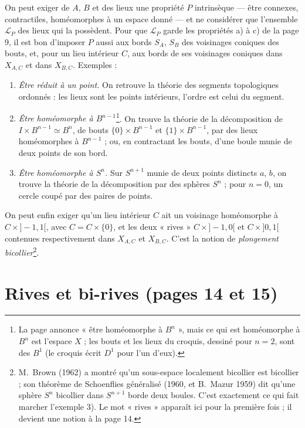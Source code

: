 \documentclass[11pt,a4paper]{article}
\begin{document}
On peut exiger de $A$, $B$ et des lieux une propriété $P$ intrinsèque --- être
connexes, contractiles, homéomorphes à un espace donné --- et ne considérer que
l'ensemble $\mathcal{L}_{P}$ des lieux qui la possèdent. Pour que $\mathcal{L}_{P}$
garde les propriétés a) à c) de la page 9, il est bon d'imposer $P$ aussi aux bords
$S_{A}$, $S_{B}$ des voisinages coniques des bouts, et, pour un lieu intérieur $C$,
aux bords de ses voisinages coniques dans $X_{A,C}$ et dans $X_{B,C}$. Exemples :
\begin{enumerate}
\item[1)] \emph{Être réduit à un point.} On retrouve la théorie des segments
topologiques ordonnés : les lieux sont les points intérieurs, l'ordre est celui du
segment.
\item[2)] \emph{Être homéomorphe à $B^{n-1}$}\footnote{La page annonce « être
homéomorphe à $B^{n}$ », mais ce qui est homéomorphe à $B^{n}$ est l'espace $X$ ;
les bouts et les lieux du croquis, dessiné pour $n = 2$, sont des $B^{1}$ (le
croquis écrit $D^{1}$ pour l'un d'eux).}. On trouve la théorie de la décomposition
de $I \times B^{n-1} \simeq B^{n}$, de bouts $\{0\} \times B^{n-1}$ et $\{1\} \times
B^{n-1}$, par des lieux homéomorphes à $B^{n-1}$ ; ou, en contractant les bouts,
d'une boule munie de deux points de son bord.
\item[3)] \emph{Être homéomorphe à $S^{n}$.} Sur $S^{n+1}$ munie de deux points
distincts $a$, $b$, on trouve la théorie de la décomposition par des sphères
$S^{n}$ ; pour $n = 0$, un cercle coupé par des paires de points.
\end{enumerate}

On peut enfin exiger qu'un lieu intérieur $C$ ait un voisinage homéomorphe à
$C \times {]-1,1[}$, avec $C = C \times \{0\}$, et les deux « rives »
$C \times {]-1,0[}$ et $C \times {]0,1[}$ contenues respectivement dans $X_{A,C}$ et
$X_{B,C}$. C'est la notion de \emph{plongement bicollier}\footnote{M.~Brown (1962)
a montré qu'un sous-espace localement bicollier est bicollier ; son théorème de
Schoenflies généralisé (1960, et B.~Mazur 1959) dit qu'une sphère $S^{n}$
bicollier dans $S^{n+1}$ borde deux boules. C'est exactement ce qui fait marcher
l'exemple 3). Le mot « rives » apparaît ici pour la première fois ; il devient
une notion à la page 14.}.

\section*{Rives et bi-rives (pages 14 et 15)}
\end{document}
